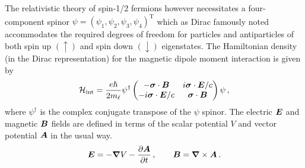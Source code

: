 The relativistic theory of spin-1/2 fermions however necessitates a four-component spinor $\psi=(\psi_{1},\psi_{2},\psi_{3},\psi_{4})^\mathrm{T}$ which as Dirac famously noted accommodates the required degrees of freedom for particles and antiparticles of both spin up $(\uparrow)$ and spin down $(\downarrow)$ eigenstates. The Hamiltonian density (in the Dirac representation) for the magnetic dipole moment interaction is given by
\begin{gather}
	\label{pauli:2}
    \mathcal{H}_\mathrm{int} = \frac{e\hbar}{2m_{\ell}}\psi^{\dag}
    \begin{pmatrix}
        -\boldsymbol{\sigma}\cdot\boldsymbol{B} & i\boldsymbol{\sigma}\cdot\boldsymbol{E}/c\\
        -i\boldsymbol{\sigma}\cdot\boldsymbol{E}/c & \boldsymbol{\sigma}\cdot\boldsymbol{B}
    \end{pmatrix}
    \psi\,,
\end{gather}
where $\psi^{\dag}$ is the complex conjugate transpose of the $\psi$ spinor. The electric $\boldsymbol{E}$ and magnetic $\boldsymbol{B}$ fields are defined in terms of the scalar potential $V$ and vector potential $\boldsymbol{A}$ in the usual way.
\begin{align}
    \label{eb:1}
    \boldsymbol{E}=-\boldsymbol{\nabla}V-\frac{\partial\boldsymbol{A}}{\partial t}\,,\qquad
    \boldsymbol{B}=\boldsymbol{\nabla}\times\boldsymbol{A}\,.
\end{align}

